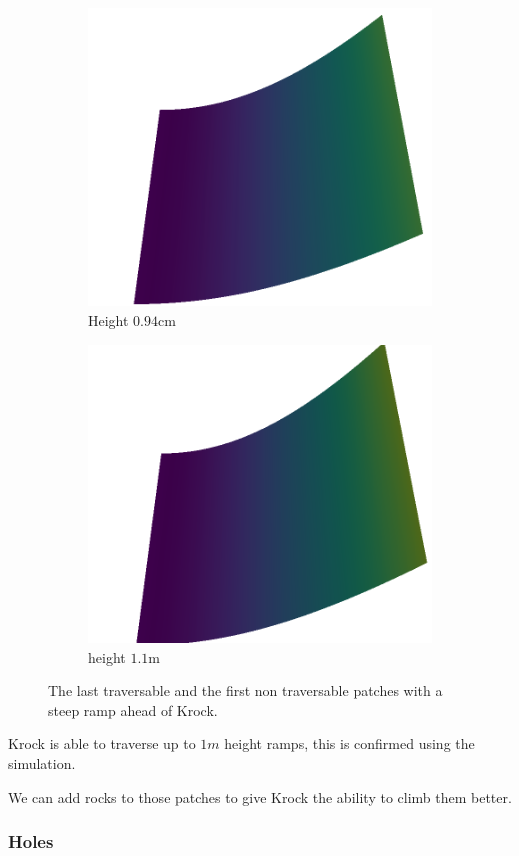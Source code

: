 \begin{figure}[H]
\begin{subfigure}[b]{0.33\textwidth}
    \end{subfigure}   
    \begin{subfigure}[b]{0.33\textwidth}
        \includegraphics[width=\linewidth]{../img/5/custom_patches/ramp/ramp-6-3d.png}
    \caption{Height $0.94$cm}
    \end{subfigure}   
    \begin{subfigure}[b]{0.33\textwidth}
        \includegraphics[width=\linewidth]{../img/5/custom_patches/ramp/ramp-7-3d}
        \caption{height $1.1$m}
    \end{subfigure}   
\caption{The last traversable and the first non traversable patches with a steep ramp ahead of Krock.}    
\end{figure}
Krock is able to traverse up to $1m$ height ramps, this is confirmed using the simulation.

We can add rocks to those patches to give Krock the ability to climb them better. 

\subsubsection{Holes}
